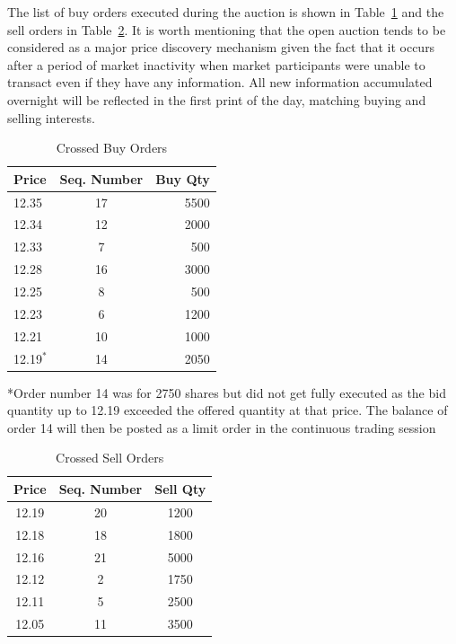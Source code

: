 The list of buy orders executed during the auction is shown in Table~\ref{tab:openAuct4} and the sell orders in Table~\ref{tab:openAuct5}. It is worth mentioning that the open auction tends to be considered as a major price discovery mechanism given the fact that it occurs after a period of market inactivity when market participants were unable to transact even if they have any information. All new information accumulated overnight will be reflected in the first print of the day, matching buying and selling interests.  


	\begin{table}[!ht]
   	\centering
   	\caption{Crossed Buy Orders \label{tab:openAuct4}}
   	\begin{tabular}{lcr} 
	Price & Seq. Number & Buy Qty  \\ \hline
	12.35 &  17 & 5500 \\
	12.34 & 12 & 2000\\	
	12.33 & 7  & 500\\			
	12.28 &  16 & 3000\\	
	12.25 & 8 & 500\\	
	12.23 & 6 & 1200\\		
	12.21  & 10& 1000\\		
	12.19$^*$ &  14  & 2050 		
   	\end{tabular}
	\begin{minipage}[t]{1\textwidth}
	\small{*Order number 14 was for 2750 shares but did not get fully executed as the bid quantity up to 12.19 exceeded the offered quantity at that price. The balance of order 14 will then be posted as a limit order in the continuous trading session}
	\end{minipage}   
	\end{table}

	
	\begin{table}[!ht]
   	\centering
   	\caption{Crossed Sell Orders\label{tab:openAuct5}}
   	\hspace*{-3.3cm}
   	\begin{tabular}{ccc} 
	Price & Seq. Number & Sell Qty  \\ \hline
	12.19 &  20 & 1200 \\
	12.18 &  18 & 1800 \\
	12.16 &  21 & 5000 \\
	12.12 & 2 & 1750 \\		
	12.11 & 5 & 2500 \\				
	12.05 & 11 & 3500 		
   	\end{tabular}
	\end{table}	


